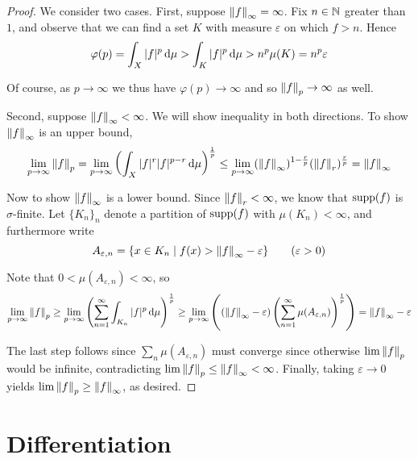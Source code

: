 \begin{proof}
     We consider two cases. First, suppose \(\norm{f}_\infty = \infty\). Fix \(n \in \mathbb{N}\) greater than \(1\), and observe that we can find a set \(K\) with measure \(\varepsilon\) on which \(f > n\). Hence
    \[
        \varphi(p) = \int_X |f|^p \, \mathrm{d}\mu > \int_K |f|^p \, \mathrm{d}\mu > n^p \mu(K) = n^p \varepsilon
    \]
    
    Of course, as \(p \to \infty\) we thus have \(\varphi(p) \to \infty\) and so \(\norm{f}_p \to \infty\) as well. 
    \stdvspace

    Second, suppose \(\norm{f}_\infty < \infty\). We will show inequality in both directions. To show \(\norm{f}_\infty\) is an upper bound, 
    \[
        \lim_{p \to \infty} \norm{f}_p = \lim_{p \to \infty} \left( \int_X |f|^r |f|^{p-r} \, \mathrm{d}\mu \right)^{\frac{1}{p}} 
        \leq \lim_{p \to \infty} (\norm{f}_\infty)^{1 - \frac{r}{p}} (\norm{f}_r)^{\frac{r}{p}}
        = \norm{f}_\infty
    \]

    Now to show \(\norm{f}_\infty\) is a lower bound. Since \(\norm{f}_r < \infty\), we know that \(\operatorname{supp}(f)\) is \(\sigma\)-finite. Let \(\{K_n\}_n\) denote a partition of \(\operatorname{supp}(f)\) with \(\mu(K_n) < \infty\), and furthermore write 
    \[
        A_{\varepsilon, n} = \{x \in K_n \mid f(x) > \norm{f}_\infty - \varepsilon\}
        \qquad (\varepsilon > 0)
    \]

    Note that \(0 < \mu(A_{\varepsilon, n}) < \infty\), so 
    \[
        \lim_{p \to \infty} \norm{f}_p 
        \geq \lim_{p \to \infty} \left( \sum_{n=1}^\infty \int_{K_n} |f|^p \, \mathrm{d}\mu \right)^{\frac{1}{p}} 
        \geq \lim_{p \to \infty} \left( (\norm{f}_\infty - \varepsilon) \left( \sum_{n=1}^\infty \mu(A_{\varepsilon, n}) \right)^{\frac{1}{p}} \right)
        = \norm{f}_\infty - \varepsilon
    \]

    The last step follows since \(\sum_n \mu(A_{\varepsilon, n})\) must converge since otherwise \(\lim \norm{f}_p\) would be infinite, contradicting \(\lim \norm{f}_p \leq \norm{f}_\infty < \infty\). Finally, taking \(\varepsilon \to 0\) yields \(\lim \norm{f}_p \geq \norm{f}_\infty\), as desired. 
\end{proof}




\newpage
\section{Differentiation}

